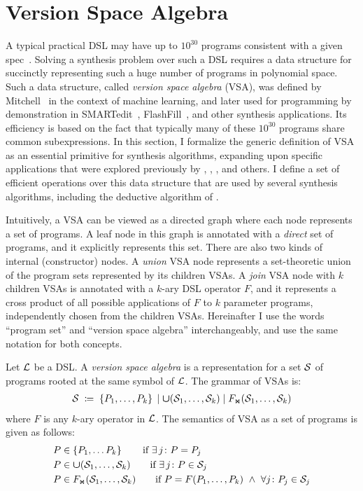 \chapter{Version Space Algebra}
\label{ch:vsa}

A typical practical DSL may have up to $10^{30}$ programs consistent with a given spec~\cite{vldb12:semantic}.
Solving a synthesis problem over such a DSL requires a data structure for succinctly representing such a huge number of
programs in polynomial space.
Such a data structure, called \emph{version space algebra} (VSA),
was defined by Mitchell~\cite{vsa:Mitchell} in the context of machine learning, and later used for programming by demonstration in
SMARTedit~\cite{lau:smartedit}, FlashFill~\cite{flashfill}, and other synthesis applications.
Its efficiency is based on the fact that typically many of these $10^{30}$ programs share common subexpressions.
In this section, I formalize the generic definition of VSA as an essential primitive for synthesis algorithms, expanding
upon specific applications that were explored previously by \citeauthor{vsa:Mitchell}, \citeauthor{lau:smartedit},
\citeauthor{flashfill}, and others.
I define a set of efficient operations over this data structure that are used by several synthesis algorithms,
including the deductive algorithm of \PROSE.

Intuitively, a VSA can be viewed as a directed graph where each node represents a set of programs.
A leaf node in this graph is annotated with a \emph{direct} set of programs, and it explicitly represents this set.
There are also two kinds of internal (constructor) nodes.
A \emph{union} VSA node represents a set-theoretic union of the program sets represented by its children VSAs.
A \emph{join} VSA node with $k$ children VSAs is annotated with a $k$-ary DSL operator $F$, and it represents a cross
product of all possible applications of $F$ to $k$ parameter programs, independently chosen from the children VSAs.
Hereinafter I use the words ``program set'' and ``version space algebra'' interchangeably, and use the same notation for both concepts.

\begin{defn}
    \label{def:vsa}
    Let $\mathcal{L}$ be a DSL.
    A \emph{version space algebra} is a representation for a set $\mathcal{S}$ of programs rooted at the same symbol of $\mathcal{L}$.
    The grammar of VSAs is:
    \begin{align*}
        \mathcal{S} \;\coloneq\; \left\{P_1, \dots, P_k\right\} \;|\; \bm{\mathsf{\cup}}(\mathcal{S}_1, \dots, \mathcal{S}_k) \;|\; F_{\text{\scriptsize\ensuremath{\Join}}}(\mathcal{S}_1, \dots, \mathcal{S}_k)
    \end{align*}
    where $F$ is any $k$-ary operator in $\mathcal{L}$.
    The semantics of VSA as a set of programs is given as follows:
    \begin{align*}
        &P \in \left\{P_1, \dots P_k\right\} \tag*{if $\exists\, j\colon P = P_j$} \\
        &P \in \vsaunion(\vsa_1, \dots, \vsa_k) \tag*{if $\exists\, j\colon P \in \vsa_j$} \\
        &P \in \joinCons(\vsa_1, \dotsc, \vsa_k) \tag*{if $P = F(P_1, \dots, P_k) \ \wedge\ \forall j\colon P_j \in \vsa_j$}
    \end{align*}
\end{defn}


